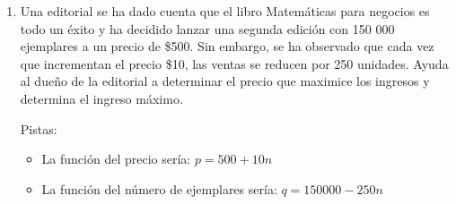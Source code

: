 \documentclass[12pt]{article}
\newenvironment{solution}{\begin{proof}[Solución]}{\end{proof}}
\begin{document}
\begin{enumerate}
    La función de ingresos en función del precio se expresa de la siguiente forma:
    \[i_{(p)} = 1500p-2p^2\]
    \begin{solution}
        Para maximizar los ingresos usamos la formula y obtenemos \[x = \frac{-b}{2a} = \frac{-1500}{-4} = 375\] por lo que el precio sugerido sería de\$375
    \end{solution}

    \item Una editorial se ha dado cuenta que el libro Matemáticas para negocios es todo un
    éxito y ha decidido lanzar una segunda edición con 150 000 ejemplares a un
    precio de \$500. Sin embargo, se ha observado que cada vez que incrementan el
    precio \$10, las ventas se reducen por 250 unidades. Ayuda al dueño de la editorial
    a determinar el precio que maximice los ingresos y determina el ingreso máximo.

    Pistas: \begin{itemize}
        \item La función del precio sería: $p = 500+10n$
        \item La función del número de ejemplares sería: $q = 150000-250n$
    \end{itemize}
\end{enumerate}


\end{document}
